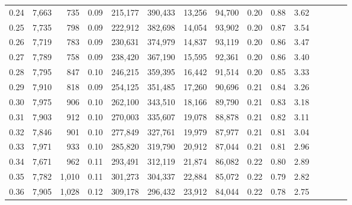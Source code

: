 \begin{tabular}{rrrcrrrrrrrrrrr}
0.24 &   7,663 &     735 &                                       0.09 &  215,177 &  390,433 &   13,256 &   94,700 &  0.20 &  0.88 &                         3.62 \\
0.25 &   7,735 &     798 &                                       0.09 &  222,912 &  382,698 &   14,054 &   93,902 &  0.20 &  0.87 &                         3.54 \\
0.26 &   7,719 &     783 &                                       0.09 &  230,631 &  374,979 &   14,837 &   93,119 &  0.20 &  0.86 &                         3.47 \\
0.27 &   7,789 &     758 &                                       0.09 &  238,420 &  367,190 &   15,595 &   92,361 &  0.20 &  0.86 &                         3.40 \\
0.28 &   7,795 &     847 &                                       0.10 &  246,215 &  359,395 &   16,442 &   91,514 &  0.20 &  0.85 &                         3.33 \\
0.29 &   7,910 &     818 &                                       0.09 &  254,125 &  351,485 &   17,260 &   90,696 &  0.21 &  0.84 &                         3.26 \\
0.30 &   7,975 &     906 &                                       0.10 &  262,100 &  343,510 &   18,166 &   89,790 &  0.21 &  0.83 &                         3.18 \\
0.31 &   7,903 &     912 &                                       0.10 &  270,003 &  335,607 &   19,078 &   88,878 &  0.21 &  0.82 &                         3.11 \\
0.32 &   7,846 &     901 &                                       0.10 &  277,849 &  327,761 &   19,979 &   87,977 &  0.21 &  0.81 &                         3.04 \\
0.33 &   7,971 &     933 &                                       0.10 &  285,820 &  319,790 &   20,912 &   87,044 &  0.21 &  0.81 &                         2.96 \\
0.34 &   7,671 &     962 &                                       0.11 &  293,491 &  312,119 &   21,874 &   86,082 &  0.22 &  0.80 &                         2.89 \\
0.35 &   7,782 &   1,010 &                                       0.11 &  301,273 &  304,337 &   22,884 &   85,072 &  0.22 &  0.79 &                         2.82 \\
0.36 &   7,905 &   1,028 &                                       0.12 &  309,178 &  296,432 &   23,912 &   84,044 &  0.22 &  0.78 &                         2.75 \\

\end{tabular}
